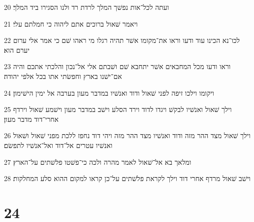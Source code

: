\par 20 ועתה לכל־אות נפשׁך המלך לרדת רד ולנו הסגירו ביד המלך׃
\par 21 ויאמר שׁאול ברוכים אתם ליהוה כי חמלתם עלי׃
\par 22 לכו־נא הכינו עוד ודעו וראו את־מקומו אשׁר תהיה רגלו מי ראהו שׁם כי אמר אלי ערום יערם הוא׃
\par 23 וראו ודעו מכל המחבאים אשׁר יתחבא שׁם ושׁבתם אלי אל־נכון והלכתי אתכם והיה אם־ישׁנו בארץ וחפשׂתי אתו בכל אלפי יהודה׃
\par 24 ויקומו וילכו זיפה לפני שׁאול ודוד ואנשׁיו במדבר מעון בערבה אל ימין הישׁימון׃
\par 25 וילך שׁאול ואנשׁיו לבקשׁ ויגדו לדוד וירד הסלע וישׁב במדבר מעון וישׁמע שׁאול וירדף אחרי־דוד מדבר מעון׃
\par 26 וילך שׁאול מצד ההר מזה ודוד ואנשׁיו מצד ההר מזה ויהי דוד נחפז ללכת מפני שׁאול ושׁאול ואנשׁיו עטרים אל־דוד ואל־אנשׁיו לתפשׂם׃
\par 27 ומלאך בא אל־שׁאול לאמר מהרה ולכה כי־פשׁטו פלשׁתים על־הארץ׃
\par 28 וישׁב שׁאול מרדף אחרי דוד וילך לקראת פלשׁתים על־כן קראו למקום ההוא סלע המחלקות׃

\chapter{24}

